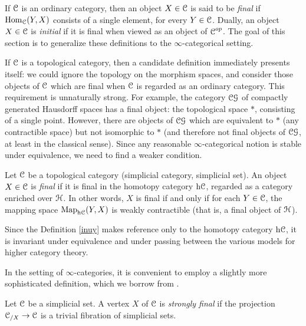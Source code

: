 \begin{Didn't Read}
If $\operatorname{\mathcal{C}}$ is an ordinary category, then an object $X \in \operatorname{\mathcal{C}}$
is said to be {\it final} if $\operatorname{Hom}_{\operatorname{\mathcal{C}}}(Y,X)$ consists of a single element, for every $Y \in \operatorname{\mathcal{C}}$. Dually, an object $X \in \operatorname{\mathcal{C}}$ is {\it initial} if it is final when viewed as an object of $\operatorname{\mathcal{C}}^{op}$.
The goal of this section is to generalize these definitions to the $\infty$-categorical setting.

If $\operatorname{\mathcal{C}}$ is a topological category, then a candidate definition immediately presents itself: we could ignore the topology on the morphism spaces, and consider those objects of $\operatorname{\mathcal{C}}$ which are final when $\operatorname{\mathcal{C}}$ is regarded as an ordinary category. This requirement is unnaturally strong. For example, the category $\operatorname{\mathcal{C}\mathcal{G}}$ of compactly generated Hausdorff spaces has a final object: the topological space $\ast$, consisting of a single point. However, there are objects of $\operatorname{\mathcal{C}\mathcal{G}}$ which are equivalent to $\ast$ (any contractible space) but
not isomorphic to $\ast$ (and therefore not final objects of $\operatorname{\mathcal{C}\mathcal{G}}$, at least in the classical sense). Since any reasonable $\infty$-categorical notion is stable under equivalence, we need to find a weaker condition.

\begin{definition}\label{inuy}
Let $\operatorname{\mathcal{C}}$ be a topological category (simplicial category, simplicial set). An object $X \in \operatorname{\mathcal{C}}$ is {\it final} if it is final in the homotopy category
$\rm{h} \it{\operatorname{\mathcal{C}}}$, regarded as a category enriched over $\operatorname{\mathcal{H}}$. In other words, $X$ is final if and only if
for each $Y \in \operatorname{\mathcal{C}}$, the mapping space $\operatorname{{Map}}_{ \rm{h} \it{\operatorname{\mathcal{C}}}}(Y,X)$ is weakly contractible
(that is, a final object of $\operatorname{\mathcal{H}}$).
\end{definition}

\begin{remark}
Since the Definition \ref{inuy} makes reference only to the homotopy category $\rm{h} \it{\operatorname{\mathcal{C}}}$, it is invariant under equivalence and under passing between the various models for higher category theory.
\end{remark}

In the setting of $\infty$-categories, it is convenient to employ a slightly more
sophisticated definition, which we borrow from \cite{joyalpub}.

\begin{definition}\label{strongfin}
Let $\operatorname{\mathcal{C}}$ be a simplicial set. A
vertex $X$ of $\operatorname{\mathcal{C}}$ is {\it strongly final} if the projection $\operatorname{\mathcal{C}}_{/X}
\rightarrow \operatorname{\mathcal{C}}$ is a trivial fibration of simplicial sets. 
\end{definition}


\end{Didn't Read}
